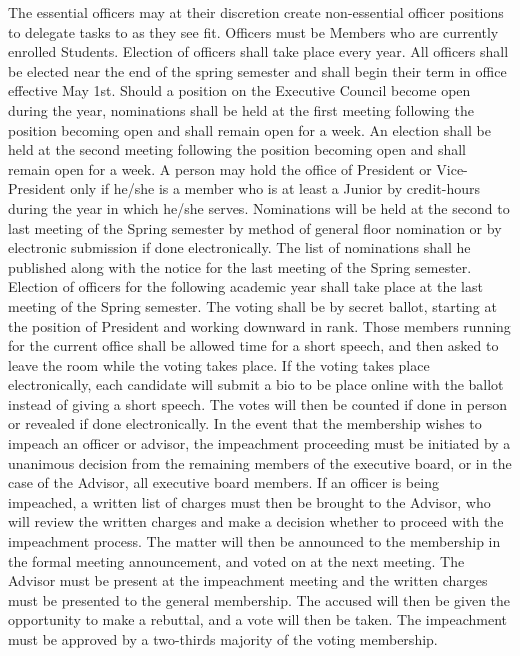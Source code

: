 \documentclass[11pt,a4paper,notitlepage]{article}
\begin{document}
The essential officers may at their discretion create non-essential officer
positions to delegate tasks to as they see fit. Officers must be Members who are
currently enrolled Students. Election of officers shall take place every year.
All officers shall be elected near the end of the spring semester and shall
begin their term in office effective May 1st. Should a position on the Executive
Council become open during the year, nominations shall be held at the first
meeting following the position becoming open and shall remain open for a week.
An election shall be held at the second meeting following the position becoming
open and shall remain open for a week. A person may hold the office of President
or Vice-President only if he/she is a member who is at least a Junior by
credit-hours during the year in which he/she serves. Nominations will be held at
the second to last meeting of the Spring semester by method of general floor
nomination or by electronic submission if done electronically. The list of
nominations shall he published along with the notice for the last meeting of the
Spring semester. Election of officers for the following academic year shall take
place at the last meeting of the Spring semester. The voting shall be by secret
ballot, starting at the position of President and working downward in rank.
Those members running for the current office shall be allowed time for a short
speech, and then asked to leave the room while the voting takes place. If the
voting takes place electronically, each candidate will submit a bio to be place
online with the ballot instead of giving a short speech. The votes will then be
counted if done in person or revealed if done electronically. In the event that
the membership wishes to impeach an officer or advisor, the impeachment
proceeding must be initiated by a unanimous decision from the remaining members
of the executive board, or in the case of the Advisor, all executive board
members. If an officer is being impeached, a written list of charges must then
be brought to the Advisor, who will review the written charges and make a
decision whether to proceed with the impeachment process. The matter will then
be announced to the membership in the formal meeting announcement, and voted on
at the next meeting. The Advisor must be present at the impeachment meeting and
the written charges must be presented to the general membership. The accused
will then be given the opportunity to make a rebuttal, and a vote will then be
taken. The impeachment must be approved by a two-thirds majority of the voting
membership.
\end{document}
